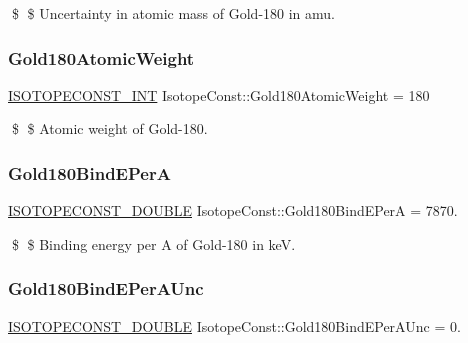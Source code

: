 \$ \$ Uncertainty in atomic mass of Gold-\/180 in amu. \mbox{\label{group___isotope_const-_gold-_au180_ga9884a562d24b05070f73614c623246dd}} 
\subsubsection{\texorpdfstring{Gold180\+Atomic\+Weight}{Gold180AtomicWeight}}
{\footnotesize\ttfamily \mbox{\hyperlink{group___isotope_const-_macros_ga5f18360b3e99483a35c32d789e62621c}{I\+S\+O\+T\+O\+P\+E\+C\+O\+N\+S\+T\+\_\+\+I\+NT}} Isotope\+Const\+::\+Gold180\+Atomic\+Weight = 180}

\$ \$ Atomic weight of Gold-\/180. \mbox{\label{group___isotope_const-_gold-_au180_ga53ebf3485554df83f775957458ba0c6d}} 
\subsubsection{\texorpdfstring{Gold180\+Bind\+E\+PerA}{Gold180BindEPerA}}
{\footnotesize\ttfamily \mbox{\hyperlink{group___isotope_const-_macros_ga8f45a7272ce02c0b4c65c44636ed719a}{I\+S\+O\+T\+O\+P\+E\+C\+O\+N\+S\+T\+\_\+\+D\+O\+U\+B\+LE}} Isotope\+Const\+::\+Gold180\+Bind\+E\+PerA = 7870.}

\$ \$ Binding energy per A of Gold-\/180 in keV. \mbox{\label{group___isotope_const-_gold-_au180_ga6711fe8865dbfbdf02ed27803ad357d3}} 
\subsubsection{\texorpdfstring{Gold180\+Bind\+E\+Per\+A\+Unc}{Gold180BindEPerAUnc}}
{\footnotesize\ttfamily \mbox{\hyperlink{group___isotope_const-_macros_ga8f45a7272ce02c0b4c65c44636ed719a}{I\+S\+O\+T\+O\+P\+E\+C\+O\+N\+S\+T\+\_\+\+D\+O\+U\+B\+LE}} Isotope\+Const\+::\+Gold180\+Bind\+E\+Per\+A\+Unc = 0.}

